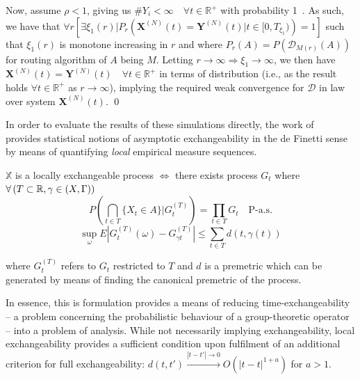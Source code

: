 Now, assume $\rho< 1$, giving us $ \# Y_{i}  < \infty \quad \forall t \in \mathbb{R}^{+}$ with probability 1~\cite{gardner_redundancy-d_2017}. As such, we have that $\forall r \left[\exists \xi_{1}(r) | P_{r}\left(\mathbf{X}^{(N)} (t) = \mathbf{Y}^{(N)}(t) |t \in [0,T_{\xi_{1}}) \right) = 1\right]$ such that $\xi_{1} (r)$ is monotone increasing in $r$ and where $P_{r}(A) = P(\mathcal{D}_{M(r)}(A))$ for routing algorithm of $A$ being $M$. Letting $r \rightarrow \infty \Rightarrow \xi_{1} \rightarrow \infty$, we then have $\mathbf{X}^{(N)}(t) =  \mathbf{Y}^{(N)}(t) \quad \forall t \in \mathbb{R}^{+}$ in terms of distribution (i.e., as the result holds $\forall t \in \mathbb{R}^{+}$ as $r\rightarrow \infty$), implying the required weak convergence for $\mathcal{D}$ in law over system  $\mathbf{X}^{(N)}(t)$.  \qed

In order to evaluate the results of these simulations directly, the work of~\cite{campbell2020local} provides statistical notions of asymptotic exchangeability in the de Finetti sense by means of quantifying \textit{local} empirical measure sequences.

\begin{definition}
    $\mathbb{X}$ is a locally exchangeable process $\iff$ there exists process $G_{t}$ where $\forall \left(T \subset\mathbb{R}, \gamma \in \text(X,\Gamma)\right) $
    \[P\left(\bigcap_{t \in T} \{X_{t} \in A\} | G^{(T)}_{t} \right) = \prod_{t \in T} G_{t} \quad \text{P-a.s.}\]
    \[\sup_{\omega}E|G^{(T)}_{t} (\omega)-G^{(T)}_{\gamma t}| \leq \sum_{t \in T} d(t, \gamma(t))\]

    where $G^{(T)}_{t}$ refers to $G_{t}$ restricted to $T$ and $d$ is a premetric which can be generated by means of finding the canonical premetric of the process.
\end{definition}
In essence, this is formulation provides a means of reducing time-exchangeability -- a problem concerning the probabilistic behaviour of a group-theoretic operator -- into a problem of analysis. While not necessarily implying exchangeability, local exchangeability provides a sufficient condition upon fulfilment of an additional criterion for full exchangeability: $d(t,t') \overset{|t-t'|\rightarrow 0}\rightarrow O(|t-t|^{1+a})$ for $a>1$.

